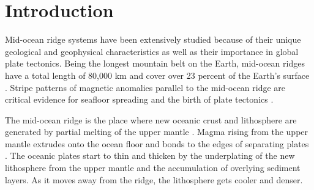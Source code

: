 \documentclass[letterpaper,12pt,notitle]{memphisthesis}                     %
\begin{document}
\newpage



\begin{singlespace}
	\listoffigures
\end{singlespace}

\newpage


\chapter{Introduction}
\setcounter{section}{0}
\setcounter{subsection}{0}

Mid-ocean ridge systems have been extensively studied because of their unique geological and geophysical characteristics as well as their importance in global plate tectonics. Being the longest mountain belt on the Earth, mid-ocean ridges have a total length of 80,000 km and cover over 23 percent of the Earth’s surface \citep{Peltier1989}. Stripe patterns of magnetic anomalies parallel to the mid-ocean ridge are critical evidence for seafloor spreading and the birth of plate tectonics \citep{Hess1964}.

The mid-ocean ridge is the place where new oceanic crust and lithosphere are generated by partial melting of the upper mantle \citep{Cann1968}. Magma rising from the upper mantle extrudes onto the ocean floor and bonds to the edges of separating plates \citep{Chen1992}. The oceanic plates start to thin and thicken by the underplating of the new lithosphere from the upper mantle and the accumulation of overlying sediment layers. As it moves away from the ridge, the lithosphere gets cooler and denser.
\end{document}
